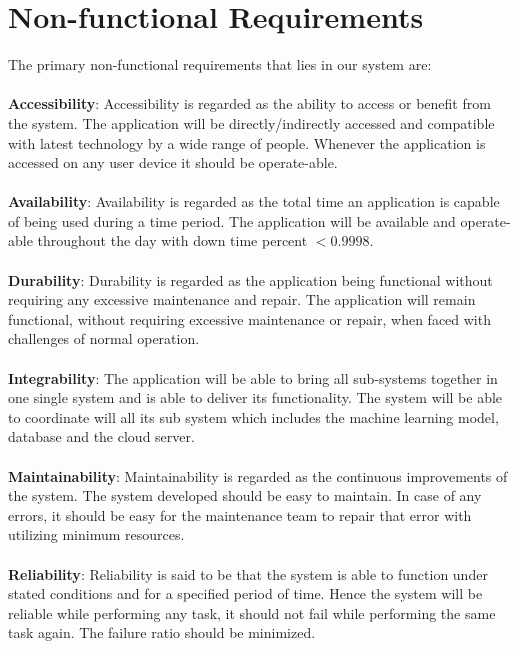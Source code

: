 \newpage
\section{Non-functional Requirements}

The primary non-functional requirements that lies in our system are:\\
\\
\textbf{Accessibility}:
Accessibility is regarded as the ability to access or benefit from the system. The application will be directly/indirectly accessed and compatible with latest technology by a wide range of people. Whenever the application is accessed on any user device it should be operate-able.\\
\\
\textbf{Availability}: 
Availability is regarded as the total time an application is capable of being used during a time period. The application will be available and operate-able throughout the day with down time percent $<0.9998$.\\
\\
\textbf{Durability}: 
Durability is regarded as the application being functional without requiring any excessive maintenance and repair. The application will remain functional, without requiring excessive maintenance or repair, when faced with challenges of normal operation.\\
\\
\textbf{Integrability}: 
The application will be able to bring all sub-systems together in one single system and is able to deliver its functionality. The system will be able to coordinate will all its sub system which includes the machine learning model, database and the cloud server.\\
\\
\textbf{Maintainability}:
Maintainability is regarded as the continuous improvements of the system. The system developed should be easy to maintain. In case of any errors, it should be easy for the maintenance team to repair that error with utilizing minimum resources.\\
\\
\textbf{Reliability}:
Reliability is said to be that the system is able to function under stated conditions and for a specified period of time. Hence the system will be reliable while performing any task, it should not fail while performing the same task again. The failure ratio should be minimized.



